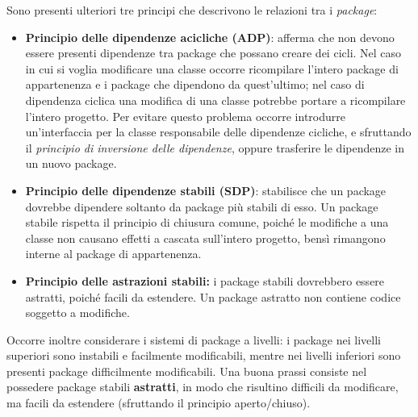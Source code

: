 \begin{solution}
\newline
\newline
Sono presenti ulteriori tre principi che descrivono le relazioni tra i \textit{package}:
\begin{itemize}
	\item \textbf{Principio delle dipendenze acicliche (ADP)}: afferma che non devono essere presenti dipendenze tra package che possano creare dei cicli.
	Nel caso in cui si voglia modificare una classe occorre ricompilare l'intero package di appartenenza e i package che dipendono da quest'ultimo; nel caso di dipendenza ciclica una modifica di una classe potrebbe portare a ricompilare l'intero progetto.
	\newline
	Per evitare questo problema occorre introdurre un'interfaccia per la classe responsabile delle dipendenze cicliche, e sfruttando il \textit{principio di inversione delle dipendenze}, oppure trasferire le dipendenze in un nuovo package.
	\item \textbf{Principio delle dipendenze stabili (SDP)}: stabilisce che un package dovrebbe dipendere soltanto da package più stabili di esso.
	\newline
	Un package stabile rispetta il principio di chiusura comune, poiché le modifiche a una classe non causano effetti a cascata sull'intero progetto, bensì rimangono interne al package di appartenenza.
	\item \textbf{Principio delle astrazioni stabili:} i package stabili dovrebbero essere astratti, poiché facili da estendere. Un package astratto non contiene codice soggetto a modifiche.
\end{itemize}
Occorre inoltre considerare i sistemi di package a livelli: i package nei livelli superiori sono instabili e facilmente modificabili, mentre nei livelli inferiori sono presenti package difficilmente modificabili.
Una buona prassi consiste nel possedere package stabili \textbf{astratti}, in modo che risultino difficili da modificare, ma facili da estendere (sfruttando il principio aperto/chiuso).

\end{solution}


